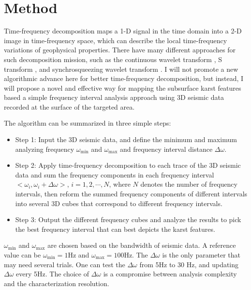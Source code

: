 \section{Method}
Time-frequency decomposition maps a 1-D signal in the time domain into a 2-D image in time-frequency space, which can describe the local time-frequency variations
of geophysical properties. There have  many different approaches for such decomposition mission, such as the continuous wavelet transform , S transform , and synchrosqueezing wavelet transform . I will not promote a new algorithmic advance here for better time-frequency decomposition, but instead, I will propose a novel and effective way for mapping the subsurface karst features based  a simple frequency interval analysis approach using 3D seismic data recorded at the surface of the targeted area. 

The algorithm can be summarized in three simple steps:  
\begin{itemize}
\item Step 1: Input the 3D seismic data, and define the minimum and maximum analyzing frequency $\omega_{\min}$ and $ \omega_{\max}$ and frequency interval distance $\Delta \omega$.
\item Step 2: Apply time-frequency decomposition to each trace of the 3D seismic data and sum the frequency components in each frequency interval $<\omega_i,\omega_{i}+\Delta \omega>$, $i=1,2,\cdots,N$, where $N$ denotes the number of frequency intervals, then reform the summed frequency components of different intervals into several 3D cubes that correspond to different frequency intervals.
\item Step 3: Output the different frequency cubes and analyze the results to pick the best frequency interval that can best depicts the karst features.
\end{itemize}

$\omega_{\min}$ and $\omega_{\max}$ are chosen based on the bandwidth of seismic data. A reference value can be $\omega_{\min}=1$Hz and $\omega_{\max}=100$Hz. The $\Delta \omega$ is the only parameter that may need several trials. One can test the $\Delta \omega$ from 5Hz to 30 Hz, and updating $\Delta \omega$ every 5Hz. The choice of $\Delta \omega$ is a compromise between analysis complexity and the characterization resolution.


